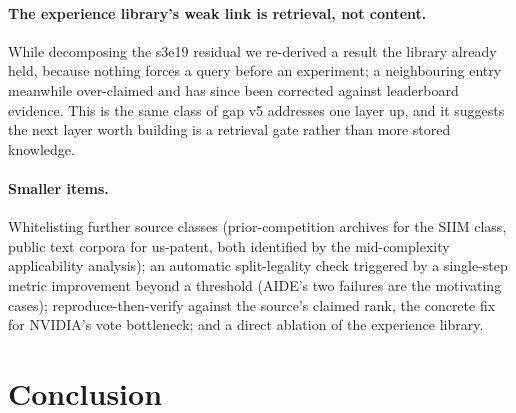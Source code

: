 \documentclass[11pt,a4paper]{article}
\begin{document}
\paragraph{The experience library's weak link is retrieval, not content.} While decomposing
the s3e19 residual we re-derived a result the library already held, because nothing forces a
query before an experiment; a neighbouring entry meanwhile over-claimed and has since been
corrected against leaderboard evidence. This is the same class of gap v5 addresses one layer
up, and it suggests the next layer worth building is a retrieval gate rather than more stored
knowledge.

\paragraph{Smaller items.} Whitelisting further source classes (prior-competition archives for
the SIIM class, public text corpora for us-patent, both identified by the mid-complexity
applicability analysis); an automatic split-legality check triggered by a single-step metric
improvement beyond a threshold (AIDE's two failures are the motivating cases); reproduce-then-verify
against the source's claimed rank, the concrete fix for NVIDIA's vote bottleneck; and a direct
ablation of the experience library.

\section{Conclusion}
\end{document}
